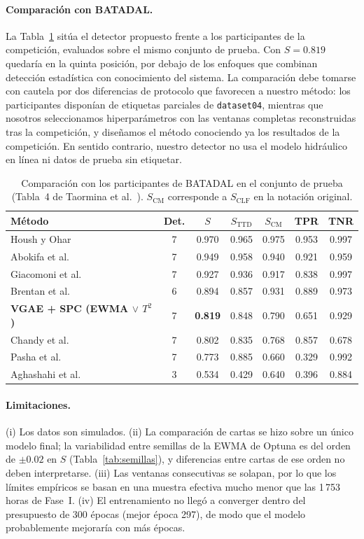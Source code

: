 \documentclass[11pt,a4paper]{article}
\begin{document}
\paragraph{Comparación con BATADAL.} La Tabla~\ref{tab:batadal} sitúa el detector
propuesto frente a los participantes de la competición, evaluados sobre el mismo
conjunto de prueba. Con $S=0.819$ quedaría en la quinta posición, por debajo de los
enfoques que combinan detección estadística con conocimiento del sistema. La
comparación debe tomarse con cautela por dos diferencias de protocolo que favorecen a
nuestro método: los participantes disponían de etiquetas parciales de
\texttt{dataset04}, mientras que nosotros seleccionamos hiperparámetros con las
ventanas completas reconstruidas tras la competición, y diseñamos el método conociendo
ya los resultados de la competición. En sentido contrario, nuestro detector no usa el
modelo hidráulico en línea ni datos de prueba sin etiquetar.

\begin{table}[t]
\centering
\caption{Comparación con los participantes de BATADAL en el conjunto de prueba (Tabla~4 de Taormina et al.~\cite{taormina2018}). $S_{\mathrm{CM}}$ corresponde a $S_{\mathrm{CLF}}$ en la notación original.}
\label{tab:batadal}
\small
\begin{tabular}{@{}lcccccc@{}}
\toprule
Método & Det. & $S$ & $S_{\mathrm{TTD}}$ & $S_{\mathrm{CM}}$ & TPR & TNR \\
\midrule
Housh y Ohar & 7 & 0.970 & 0.965 & 0.975 & 0.953 & 0.997 \\
Abokifa et al. & 7 & 0.949 & 0.958 & 0.940 & 0.921 & 0.959 \\
Giacomoni et al. & 7 & 0.927 & 0.936 & 0.917 & 0.838 & 0.997 \\
Brentan et al. & 6 & 0.894 & 0.857 & 0.931 & 0.889 & 0.973 \\
\textbf{VGAE + SPC (EWMA $\vee$ $T^2$)} & 7 & \textbf{0.819} & 0.848 & 0.790 & 0.651 & 0.929 \\
Chandy et al. & 7 & 0.802 & 0.835 & 0.768 & 0.857 & 0.678 \\
Pasha et al. & 7 & 0.773 & 0.885 & 0.660 & 0.329 & 0.992 \\
Aghashahi et al. & 3 & 0.534 & 0.429 & 0.640 & 0.396 & 0.884 \\
\bottomrule
\end{tabular}
\end{table}

\paragraph{Limitaciones.} (i) Los datos son simulados. (ii) La comparación de cartas
se hizo sobre un único modelo final; la variabilidad entre semillas de la EWMA de
Optuna es del orden de $\pm0.02$ en $S$ (Tabla~\ref{tab:semillas}), y diferencias entre
cartas de ese orden no deben interpretarse. (iii) Las ventanas consecutivas se solapan,
por lo que los límites empíricos se basan en una muestra efectiva mucho menor que las
1\,753 horas de Fase~I. (iv) El entrenamiento no llegó a converger dentro del
presupuesto de 300 épocas (mejor época 297), de modo que el modelo probablemente
mejoraría con más épocas.
\end{document}
